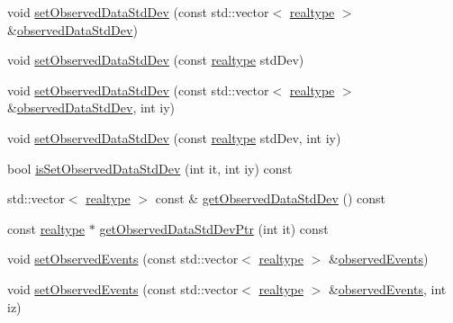 \begin{DoxyCompactItemize}
\item 
void \mbox{\hyperlink{classamici_1_1_exp_data_a5d84a162eb705e032820acd004603f29}{set\+Observed\+Data\+Std\+Dev}} (const std\+::vector$<$ \mbox{\hyperlink{namespaceamici_a1bdce28051d6a53868f7ccbf5f2c14a3}{realtype}} $>$ \&\mbox{\hyperlink{classamici_1_1_exp_data_aa097568cebb4be48c4c1dfaab0c2a159}{observed\+Data\+Std\+Dev}})
\item 
void \mbox{\hyperlink{classamici_1_1_exp_data_ae6ed832b9bee1861d233c90d5a37c677}{set\+Observed\+Data\+Std\+Dev}} (const \mbox{\hyperlink{namespaceamici_a1bdce28051d6a53868f7ccbf5f2c14a3}{realtype}} std\+Dev)
\item 
void \mbox{\hyperlink{classamici_1_1_exp_data_a90948c75e8ce51cd69be08a92215e6c2}{set\+Observed\+Data\+Std\+Dev}} (const std\+::vector$<$ \mbox{\hyperlink{namespaceamici_a1bdce28051d6a53868f7ccbf5f2c14a3}{realtype}} $>$ \&\mbox{\hyperlink{classamici_1_1_exp_data_aa097568cebb4be48c4c1dfaab0c2a159}{observed\+Data\+Std\+Dev}}, int iy)
\item 
void \mbox{\hyperlink{classamici_1_1_exp_data_a10c64e99f5f3a2b19e3944b69b0d69ff}{set\+Observed\+Data\+Std\+Dev}} (const \mbox{\hyperlink{namespaceamici_a1bdce28051d6a53868f7ccbf5f2c14a3}{realtype}} std\+Dev, int iy)
\item 
bool \mbox{\hyperlink{classamici_1_1_exp_data_a75808a32f77afa60bb736a1dfbce9aba}{is\+Set\+Observed\+Data\+Std\+Dev}} (int it, int iy) const
\item 
std\+::vector$<$ \mbox{\hyperlink{namespaceamici_a1bdce28051d6a53868f7ccbf5f2c14a3}{realtype}} $>$ const  \& \mbox{\hyperlink{classamici_1_1_exp_data_ada8a2eebadd4eba1a7c3fa1a014a76d0}{get\+Observed\+Data\+Std\+Dev}} () const
\item 
const \mbox{\hyperlink{namespaceamici_a1bdce28051d6a53868f7ccbf5f2c14a3}{realtype}} $\ast$ \mbox{\hyperlink{classamici_1_1_exp_data_ad0ca0d6d8d5b6bb5587570d70bd3a4fc}{get\+Observed\+Data\+Std\+Dev\+Ptr}} (int it) const
\item 
void \mbox{\hyperlink{classamici_1_1_exp_data_ae621c2d67f85f390d01a97658c956098}{set\+Observed\+Events}} (const std\+::vector$<$ \mbox{\hyperlink{namespaceamici_a1bdce28051d6a53868f7ccbf5f2c14a3}{realtype}} $>$ \&\mbox{\hyperlink{classamici_1_1_exp_data_a629e6085839e16bac95ef0eba580f7f0}{observed\+Events}})
\item 
void \mbox{\hyperlink{classamici_1_1_exp_data_a22ae335c4988600623e7a0c5ca7b47aa}{set\+Observed\+Events}} (const std\+::vector$<$ \mbox{\hyperlink{namespaceamici_a1bdce28051d6a53868f7ccbf5f2c14a3}{realtype}} $>$ \&\mbox{\hyperlink{classamici_1_1_exp_data_a629e6085839e16bac95ef0eba580f7f0}{observed\+Events}}, int iz)

\end{DoxyCompactItemize}
